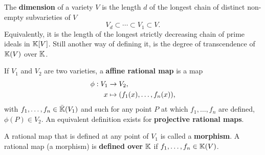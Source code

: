 The \textbf{dimension} of a variety $V$
is the length $d$ of the longest chain of distinct non-empty
subvarieties of $V$
\begin{equation}
  \label{eq:219}
  V_d \subset \cdots \subset V_1 \subset V
  \text{.}
\end{equation}
Equivalently, it is the length of the longest strictly decreasing
chain of prime ideals in $\mathbb{K}[V]$. Still another way of defining it, is
the degree of transcendence of $\mathbb{K}(V)$ over $\mathbb{K}$.

If $V_1$ and $V_2$ are two varieties, a
\textbf{affine rational map} is a map
\begin{equation}
  \label{eq:220}
  \begin{aligned}
    \phi : V_1&\rightarrow V_2\text{,}\\
    x &\mapsto (f_1(x),\ldots,f_n(x))\text{,}
  \end{aligned}
\end{equation}
with $f_1,\ldots,f_n\in\bar{\mathbb{K}}(V_1)$ and such for any point $P$ at
which $f_1,\ldots,f_n$ are defined, $\phi(P)\in V_2$. An equivalent
definition exists for \textbf{projective rational maps}.

A rational map that is defined at any point of $V_1$ is called a
\textbf{morphism}. A rational map (a
morphism) is
\textbf{defined
  over} $\mathbb{K}$ if $f_1,\ldots,f_n\in\mathbb{K}(V)$.





